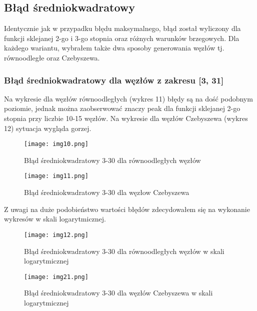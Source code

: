 \documentclass{article}
\begin{document}
\subsection{Błąd średniokwadratowy}

Identycznie jak w przypadku błędu maksymalnego, błąd został wyliczony dla funkcji sklejanej 2-go i 3-go stopnia oraz różnych warunków brzegowych. Dla każdego wariantu, wybrałem także dwa sposoby generowania węzłów tj. równoodległe oraz Czebyszewa.

\subsubsection{Błąd średniokwadratowy dla węzłów z zakresu [3, 31]}

\bigbreak
Na wykresie dla węzłów równoodległych (wykres 11) błędy są na dość podobnym poziomie, jednak można zaobserwować znaczy peak dla funkcji sklejanej 2-go stopnia przy liczbie 10-15 węzłów. Na wykresie dla węzłów Czebyszewa (wykres 12) sytuacja wygląda gorzej.

\begin{figure}[H]
  \begin{minipage}[b]{0.49\textwidth}
    \texttt{[image: img10.png]}
    \caption{Błąd średniokwadratowy 3-30 dla równoodległych węzłów}
  \end{minipage}
  \hfill
  \begin{minipage}[b]{0.49\textwidth}
    \texttt{[image: img11.png]}
    \caption{Błąd średniokwadratowy 3-30 dla węzłow Czebyszewa}
  \end{minipage}
\end{figure}

\noindent
Z uwagi na duże podobieństwo wartości błędów zdecydowałem się na wykonanie wykresów w skali logarytmicznej. 

\begin{figure}[H]
  \begin{minipage}[b]{0.49\textwidth}
    \texttt{[image: img12.png]}
    \caption{Błąd średniokwadratowy 3-30 dla równoodległych węzłów w skali logarytmicznej}
  \end{minipage}
  \hfill
  \begin{minipage}[b]{0.49\textwidth}
    \texttt{[image: img21.png]}
    \caption{Błąd średniokwadratowy 3-30 dla węzłów Czebyszewa w skali logarytmicznej}
  \end{minipage}
\end{figure}
\end{document}
